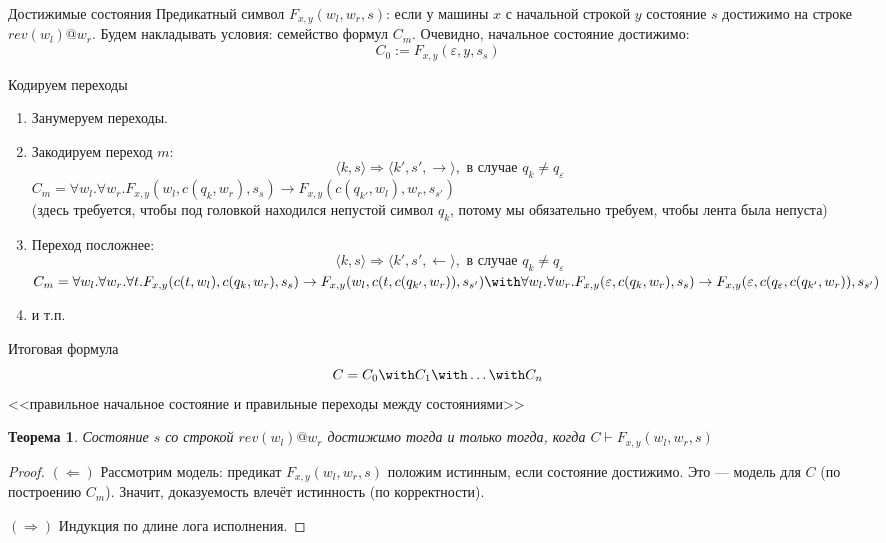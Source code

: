 \documentclass[aspectratio=169]{beamer}
\newtheorem{thm}{Теорема}[section]
\begin{document}
\begin{frame}{Достижимые состояния}
Предикатный символ $F_{x,y}(w_l,w_r,s)$: если у машины $x$ с начальной строкой $y$ состояние $s$ достижимо на строке $rev(w_l) @ w_r$. 
\pause
Будем накладывать условия: семейство формул $C_m$. \pause
Очевидно, начальное состояние достижимо:
$$C_0 := F_{x,y}(\varepsilon,y,s_s)$$
\end{frame}


\begin{frame}{Кодируем переходы}
\begin{enumerate}
\item Занумеруем переходы.\pause
\item Закодируем переход $m$: $$\langle k, s \rangle \Rightarrow \langle k', s', \rightarrow \rangle, \text{ в случае } q_k \ne q_\varepsilon$$
$C_m = \forall w_l.\forall w_r.F_{x,y}(w_l,c(q_k,w_r),s_s) \rightarrow F_{x,y}(c(q_{k'},w_l),w_r,s_{s'})$\\
(здесь требуется, чтобы под головкой находился непустой символ $q_k$, потому мы обязательно требуем, чтобы лента была
непуста)\pause

\item Переход посложнее:
$$\langle k, s \rangle \Rightarrow \langle k', s', \leftarrow \rangle, \text{ в случае } q_k \ne q_\varepsilon$$
$C_m = \forall w_l.\forall w_r.\forall t.F_{x,y}(c(t,w_l),c(q_k,w_r),s_s) \rightarrow F_{x,y}(w_l,c(t,c(q_{k'},w_r)),s_{s'}) \with
\forall w_l.\forall w_r.F_{x,y}(\varepsilon,c(q_k,w_r),s_s) \rightarrow F_{x,y}(\varepsilon,c(q_\varepsilon,c(q_{k'},w_r)),s_{s'})$\\
\pause
\item и т.п.
\end{enumerate}
\end{frame}

\begin{frame}{Итоговая формула}
$$C = C_0 \with C_1 \with \dots \with C_n$$
<<правильное начальное состояние и правильные переходы между состояниями>>\pause

\begin{thm}
Состояние $s$ со строкой $rev(w_l)@w_r$ достижимо тогда и только тогда, когда
$C \vdash F_{x,y}(w_l,w_r,s)$\pause
\end{thm}
\begin{proof}
$(\Leftarrow)$ Рассмотрим модель: предикат $F_{x,y}(w_l,w_r,s)$ положим истинным, если состояние достижимо. \pause
Это --- модель для $C$ (по построению $C_m$). \pause
Значит, доказуемость влечёт истинность (по корректности). \pause

$(\Rightarrow)$ Индукция по длине лога исполнения.
\end{proof}
\end{frame}
\end{document}
